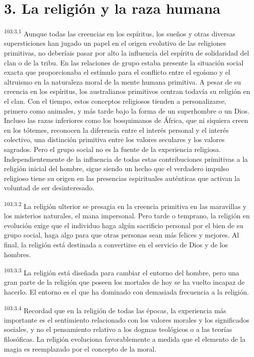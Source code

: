 \section*{3. La religión y la raza humana}
\par
\textsuperscript{103:3.1} Aunque todas las creencias en los espíritus, los sueños y otras diversas supersticiones han jugado un papel en el origen evolutivo de las religiones primitivas, no deberíais pasar por alto la influencia del espíritu de solidaridad del clan o de la tribu. En las relaciones de grupo estaba presente la situación social exacta que proporcionaba el estímulo para el conflicto entre el egoísmo y el altruismo en la naturaleza moral de la mente humana primitiva. A pesar de su creencia en los espíritus, los australianos primitivos centran todavía su religión en el clan. Con el tiempo, estos conceptos religiosos tienden a personalizarse, primero como animales, y más tarde bajo la forma de un superhombre o un Dios. Incluso las razas inferiores como los bosquimanos de África, que ni siquiera creen en los tótemes, reconocen la diferencia entre el interés personal y el interés colectivo, una distinción primitiva entre los valores seculares y los valores sagrados. Pero el grupo social no es la fuente de la experiencia religiosa. Independientemente de la influencia de todas estas contribuciones primitivas a la religión inicial del hombre, sigue siendo un hecho que el verdadero impulso religioso tiene su origen en las presencias espirituales auténticas que activan la voluntad de ser desinteresado.

\par
\textsuperscript{103:3.2} La religión ulterior se presagia en la creencia primitiva en las maravillas y los misterios naturales, el mana impersonal. Pero tarde o temprano, la religión en evolución exige que el individuo haga algún sacrificio personal por el bien de su grupo social, haga algo para que otras personas sean más felices y mejores. Al final, la religión está destinada a convertirse en el servicio de Dios y de los hombres.

\par
\textsuperscript{103:3.3} La religión está diseñada para cambiar el entorno del hombre, pero una gran parte de la religión que poseen los mortales de hoy se ha vuelto incapaz de hacerlo. El entorno es el que ha dominado con demasiada frecuencia a la religión.

\par
\textsuperscript{103:3.4} Recordad que en la religión de todas las épocas, la experiencia más importante es el sentimiento relacionado con los valores morales y los significados sociales, y no el pensamiento relativo a los dogmas teológicos o a las teorías filosóficas. La religión evoluciona favorablemente a medida que el elemento de la magia es reemplazado por el concepto de la moral.

